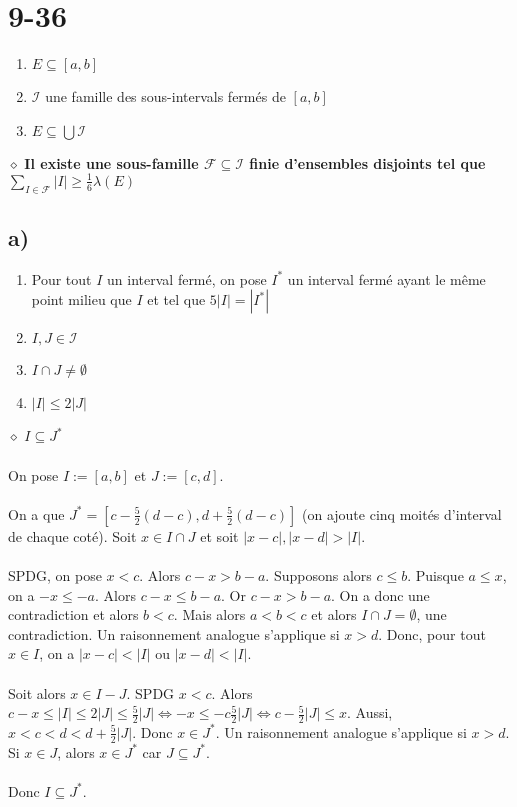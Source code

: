 \documentclass[a4paper,10pt]{article}
\begin{document}
\section*{9-36}
\begin{enumerate}
	\item $E \subseteq [a,b]$
	\item $\mathcal{I}$ une famille des sous-intervals fermés de $[a,b]$
	\item $E \subseteq \bigcup \mathcal{I}$
\end{enumerate}
$\diamond$ \textbf{Il existe une sous-famille $\mathcal{F} \subseteq \mathcal{I}$ finie d'ensembles disjoints tel que $\sum_{I \in \mathcal{F}} |I| \geq \frac{1}{6}\lambda (E)$}
\subsection*{a)}
\begin{enumerate}
	\item Pour tout $I$ un interval fermé, on pose $I^*$ un interval fermé ayant le même point milieu que $I$ et tel que $5|I| = |I^*|$
	\item $I,J \in \mathcal{I}$
	\item $I \cap J \neq \emptyset$
	\item $|I| \leq 2|J|$
\end{enumerate}
$\diamond$ \textbf{$I \subseteq J^*$}
\\
\\
On pose $I := [a,b]$ et $J := [c,d]$. 
\\
\\
On a que $J^* = [c - \frac{5}{2}(d-c), d + \frac{5}{2}(d-c)]$ (on ajoute cinq moités d'interval de chaque coté). Soit $x \in I \cap J$ et soit $|x - c|, |x - d| > |I|$.
\\
\\
SPDG, on pose $x < c$. Alors $c - x > b - a$. Supposons alors $c \leq b$. Puisque $a \leq x$, on a $-x \leq -a$. Alors $c - x \leq b - a$. Or $c - x > b - a$. On a donc une contradiction et alors $b < c$. Mais alors $a < b < c$ et alors $I \cap J = \emptyset$, une contradiction. Un raisonnement analogue s'applique si $x > d$. Donc, pour tout $x \in I$, on a $|x - c| < |I|$ ou $|x - d| < |I|$.
\\
\\
Soit alors $x \in I - J$. SPDG $x < c$. Alors $c - x \leq |I| \leq 2|J| \leq \frac{5}{2}|J| \Leftrightarrow -x \leq -c \frac{5}{2}|J| \Leftrightarrow c - \frac{5}{2}|J| \leq x $. Aussi, $x < c < d < d + \frac{5}{2}|J|$. Donc $x \in J^*$. Un raisonnement analogue s'applique si $x > d$. Si $x \in J$, alors $x \in J^*$ car $J \subseteq J^*$.
\\
\\
Donc $I \subseteq J^*$.   
\end{document}
